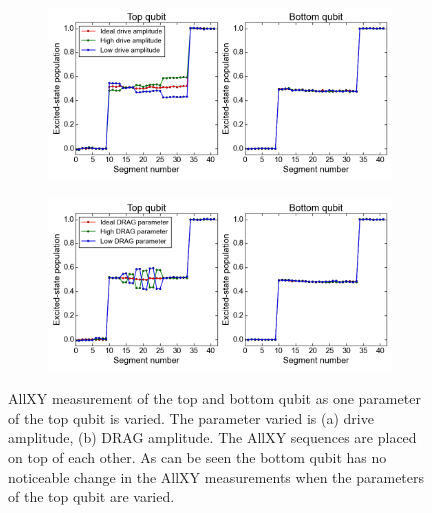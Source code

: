       \begin{figure}
      \centering
         \begin{subfigure}[b]{\textwidth}
         \includegraphics[width=1\linewidth]{../Figures/Exploring frequency re-use/AllXY_drive_top.png}
         \caption{}
         \label{fig:AllXY drive top}
      \end{subfigure}

      \begin{subfigure}[b]{\textwidth}
         \includegraphics[width=1\linewidth]{../Figures/Exploring frequency re-use/AllXY_drag_top.png}
         \caption{}
         \label{fig:AllXY DRAG top}
      \end{subfigure}

      \caption[Two numerical solutions]{AllXY measurement of the top and bottom qubit as one parameter of the top qubit is varied. The parameter varied is (a) drive amplitude, (b) DRAG amplitude. The AllXY sequences are placed on top of each other. As can be seen the bottom qubit has no noticeable change in the AllXY measurements when the parameters of the top qubit are varied.}
      \label{fig:AllXY individual control}
      \end{figure}



